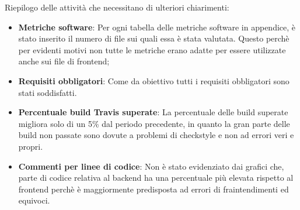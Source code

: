 
Riepilogo delle attività che necessitano di ulteriori chiarimenti:
\begin{itemize}
    \item \textbf{Metriche software}: Per ogni tabella delle metriche software in appendice, è stato inserito 
    il numero di file sui quali essa è stata valutata.
    Questo perchè per evidenti motivi non tutte le metriche erano adatte per essere utilizzate anche 
    sui file di frontend;
    \item \textbf{Requisiti obbligatori}: Come da obiettivo tutti i requisiti obbligatori
    sono stati soddisfatti.
    \item \textbf{Percentuale build Travis superate}: La percentuale delle build superate migliora solo di
    un 5\% dal
    periodo precedente, in quanto la gran parte delle build non passate sono dovute a problemi
    di checkstyle e non ad errori veri e propri.
    \item \textbf{Commenti per linee di codice}: Non è stato evidenziato dai grafici che, parte di codice relativa al backend ha una percentuale
    più elevata rispetto al frontend perchè è maggiormente predisposta ad errori di fraintendimenti ed equivoci.
\end{itemize}